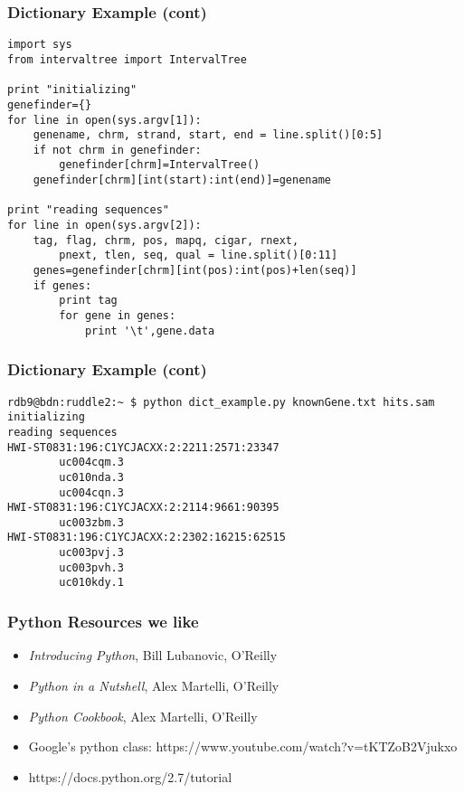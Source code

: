 \documentclass[10pt]{beamer}
\newcommand\smallfont{\fontsize{8pt}{7.2}\selectfont}
\begin{document}
\begin{frame}[fragile]
\frametitle{Dictionary Example (cont)}

\smallfont
\begin{verbatim}
import sys
from intervaltree import IntervalTree

print "initializing"
genefinder={}
for line in open(sys.argv[1]):
    genename, chrm, strand, start, end = line.split()[0:5]
    if not chrm in genefinder:
        genefinder[chrm]=IntervalTree()
    genefinder[chrm][int(start):int(end)]=genename

print "reading sequences"
for line in open(sys.argv[2]):
    tag, flag, chrm, pos, mapq, cigar, rnext, 
        pnext, tlen, seq, qual = line.split()[0:11]
    genes=genefinder[chrm][int(pos):int(pos)+len(seq)]
    if genes:
        print tag
        for gene in genes:
            print '\t',gene.data

\end{verbatim}
\end{frame}

\begin{frame}[fragile]
\frametitle{Dictionary Example (cont)}

\smallfont
\begin{verbatim}
rdb9@bdn:ruddle2:~ $ python dict_example.py knownGene.txt hits.sam
initializing
reading sequences
HWI-ST0831:196:C1YCJACXX:2:2211:2571:23347
        uc004cqm.3
        uc010nda.3
        uc004cqn.3
HWI-ST0831:196:C1YCJACXX:2:2114:9661:90395
        uc003zbm.3
HWI-ST0831:196:C1YCJACXX:2:2302:16215:62515
        uc003pvj.3
        uc003pvh.3
        uc010kdy.1
\end{verbatim}
\end{frame}

\begin{frame}[fragile]
\frametitle{Python Resources we like}

\begin{itemize}
\item \textit{Introducing Python}, Bill Lubanovic, O'Reilly
\item \textit{Python in a Nutshell}, Alex Martelli, O'Reilly
\item \textit{Python Cookbook}, Alex Martelli, O'Reilly
\item Google's python class: https://www.youtube.com/watch?v=tKTZoB2Vjukxo
\item https://docs.python.org/2.7/tutorial
\end{itemize}

\end{frame}
\end{document}
